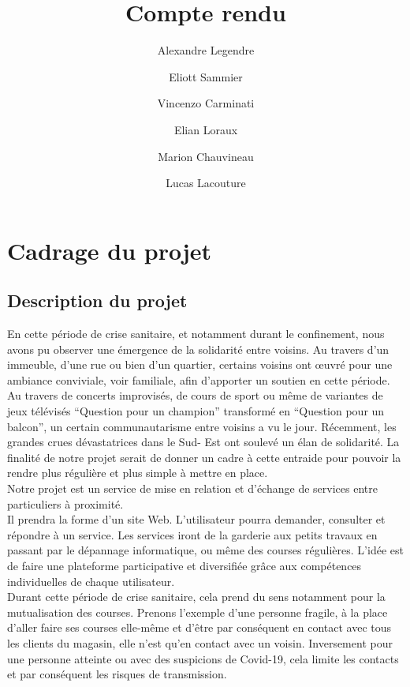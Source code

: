 \documentclass[a4paper,11pt]{article}
\title{Compte rendu}
\author{
  Alexandre Legendre\\
  \and
  Eliott Sammier\\
  \and
  Vincenzo Carminati\\
  \and
  Elian Loraux\\
  \and
  Marion Chauvineau\\
  \and
  Lucas Lacouture\\
}
\begin{document}
\maketitle
\newpage
\tableofcontents
\newpage

\section{Cadrage du projet}
\subsection{Description du projet}
En cette période de crise sanitaire, et notamment durant le confinement, nous avons pu observer une
émergence de la solidarité entre voisins. Au travers d’un immeuble, d’une rue ou bien d’un quartier,
certains voisins ont œuvré pour une ambiance conviviale, voir familiale, afin d’apporter un soutien en
cette période. Au travers de concerts improvisés, de cours de sport ou même de variantes de jeux
télévisés “Question pour un champion” transformé en “Question pour un balcon”, un certain
communautarisme entre voisins a vu le jour. Récemment, les grandes crues dévastatrices dans le Sud-
Est ont soulevé un élan de solidarité. La finalité de notre projet serait de donner un cadre à cette
entraide pour pouvoir la rendre plus régulière et plus simple à mettre en place.\\

Notre projet est un service de mise en relation et d’échange de services entre particuliers à proximité.\\

Il prendra la forme d’un site Web. L’utilisateur pourra demander, consulter et répondre à un service.
Les services iront de la garderie aux petits travaux en passant par le dépannage informatique, ou
même des courses régulières. L’idée est de faire une plateforme participative et diversifiée grâce aux
compétences individuelles de chaque utilisateur.\\

Durant cette période de crise sanitaire, cela prend du sens notamment pour la mutualisation des
courses. Prenons l’exemple d’une personne fragile, à la place d’aller faire ses courses elle-même et
d’être par conséquent en contact avec tous les clients du magasin, elle n’est qu’en contact avec un
voisin. Inversement pour une personne atteinte ou avec des suspicions de Covid-19, cela limite les
contacts et par conséquent les risques de transmission.\\
\end{document}
